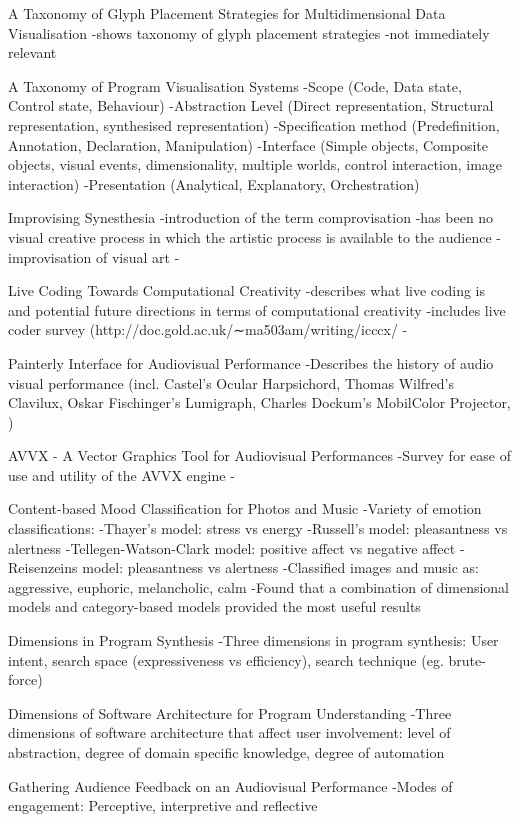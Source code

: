  A Taxonomy of Glyph Placement Strategies for Multidimensional Data Visualisation
-shows taxonomy of glyph placement strategies
-not immediately relevant

A Taxonomy of Program Visualisation Systems
-Scope (Code, Data state, Control state, Behaviour)
-Abstraction Level (Direct representation, Structural representation, synthesised representation)
-Specification method (Predefinition, Annotation, Declaration, Manipulation)
-Interface (Simple objects, Composite objects, visual events, dimensionality, multiple worlds, control interaction, image interaction)
-Presentation (Analytical, Explanatory, Orchestration)

Improvising Synesthesia
-introduction of the term comprovisation
-has been no visual creative process in which the artistic process is available to the audience
-improvisation of visual art
-

Live Coding Towards Computational Creativity
-describes what live coding is and potential future directions in terms of computational creativity
-includes live coder survey (http://doc.gold.ac.uk/∼ma503am/writing/icccx/
-

Painterly Interface for Audiovisual Performance
-Describes the history of audio visual performance (incl. Castel’s Ocular Harpsichord, Thomas Wilfred’s Clavilux, Oskar Fischinger’s Lumigraph, Charles Dockum’s MobilColor Projector, )

AVVX - A Vector Graphics Tool for Audiovisual Performances
-Survey for ease of use and utility of the AVVX engine
-

Content-based Mood Classification for Photos and Music
-Variety of emotion classifications:
	-Thayer’s model: stress vs energy
	-Russell’s model: pleasantness vs alertness
	-Tellegen-Watson-Clark model: positive affect vs negative affect
	-Reisenzeins model: pleasantness vs alertness
-Classified images and music as: aggressive, euphoric, melancholic, calm
-Found that a combination of dimensional models and category-based models provided the most useful results

Dimensions in Program Synthesis
-Three dimensions in program synthesis: User intent, search space (expressiveness vs efficiency), search technique (eg. brute-force)

Dimensions of Software Architecture for Program Understanding
-Three dimensions of software architecture that affect user involvement: level of abstraction, degree of domain specific knowledge, degree of automation

Gathering Audience Feedback on an Audiovisual Performance
-Modes of engagement: Perceptive, interpretive and reflective

